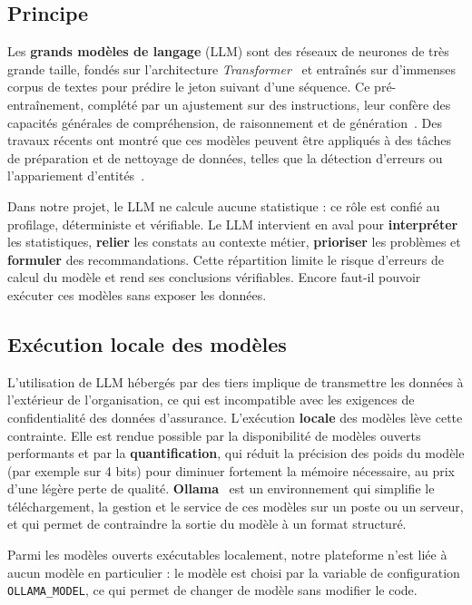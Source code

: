 \subsection{Principe}

Les \textbf{grands modèles de langage} (LLM) sont des réseaux de neurones de très grande taille, fondés sur l'architecture \textit{Transformer}~\cite{vaswani} et entraînés sur d'immenses corpus de textes pour prédire le jeton suivant d'une séquence. Ce pré-entraînement, complété par un ajustement sur des instructions, leur confère des capacités générales de compréhension, de raisonnement et de génération~\cite{brown}. Des travaux récents ont montré que ces modèles peuvent être appliqués à des tâches de préparation et de nettoyage de données, telles que la détection d'erreurs ou l'appariement d'entités~\cite{narayan}.

Dans notre projet, le LLM ne calcule aucune statistique : ce rôle est confié au profilage, déterministe et vérifiable. Le LLM intervient en aval pour \textbf{interpréter} les statistiques, \textbf{relier} les constats au contexte métier, \textbf{prioriser} les problèmes et \textbf{formuler} des recommandations. Cette répartition limite le risque d'erreurs de calcul du modèle et rend ses conclusions vérifiables. Encore faut-il pouvoir exécuter ces modèles sans exposer les données.

\subsection{Exécution locale des modèles}

L'utilisation de LLM hébergés par des tiers implique de transmettre les données à l'extérieur de l'organisation, ce qui est incompatible avec les exigences de confidentialité des données d'assurance. L'exécution \textbf{locale} des modèles lève cette contrainte. Elle est rendue possible par la disponibilité de modèles ouverts performants et par la \textbf{quantification}, qui réduit la précision des poids du modèle (par exemple sur 4 bits) pour diminuer fortement la mémoire nécessaire, au prix d'une légère perte de qualité. \textbf{Ollama}~\cite{ollama} est un environnement qui simplifie le téléchargement, la gestion et le service de ces modèles sur un poste ou un serveur, et qui permet de contraindre la sortie du modèle à un format structuré.

Parmi les modèles ouverts exécutables localement, notre plateforme n'est liée à aucun modèle en particulier : le modèle est choisi par la variable de configuration \texttt{OLLAMA\_MODEL}, ce qui permet de changer de modèle sans modifier le code.

